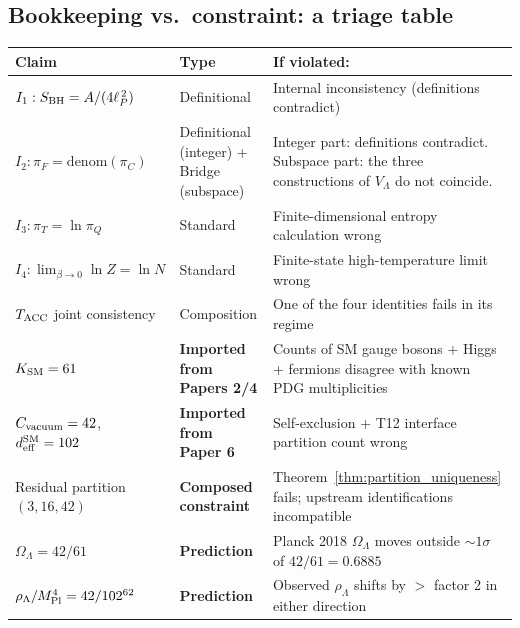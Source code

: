 \documentclass[11pt]{article}
\theoremstyle{plain}
\theoremstyle{definition}
\theoremstyle{remark}
\newcommand{\Mpl}{M_{\rm Pl}}
\begin{document}
\bigskip

\subsection{Bookkeeping vs.\ constraint: a triage table}\label{supp:Iprime1}

\begin{table}[h]
\centering
\small
\setlength{\tabcolsep}{4pt}
\begin{tabularx}{\textwidth}{@{}l l X@{}}
\toprule
\textbf{Claim} & \textbf{Type} & \textbf{If violated:} \\
\midrule
$I_1: S_{\rm BH} = A/(4\ell_P^{\,2})$                & Definitional        & Internal inconsistency (definitions contradict) \\
\addlinespace[2pt]
$I_2: \pi_F = \mathrm{denom}(\pi_C)$                 & Definitional (integer) + Bridge (subspace) & Integer part: definitions contradict.  Subspace part: the three constructions of $V_\Lambda$ do not coincide. \\
\addlinespace[2pt]
$I_3: \pi_T = \ln \pi_Q$                             & Standard            & Finite-dimensional entropy calculation wrong \\
\addlinespace[2pt]
$I_4: \lim_{\beta \to 0} \ln Z = \ln N$              & Standard            & Finite-state high-temperature limit wrong \\
\addlinespace[2pt]
$T_{\rm ACC}$ joint consistency                      & Composition         & One of the four identities fails in its regime \\
\addlinespace[4pt]
$K_{\rm SM} = 61$                                    & \textbf{Imported from Papers 2/4} & Counts of SM gauge bosons + Higgs + fermions disagree with known PDG multiplicities \\
\addlinespace[2pt]
$C_{\rm vacuum} = 42$, $d_{\rm eff}^{\rm SM} = 102$     & \textbf{Imported from Paper 6} & Self-exclusion + T12 interface partition count wrong \\
\addlinespace[2pt]
Residual partition $(3, 16, 42)$                     & \textbf{Composed constraint} & Theorem~\ref{thm:partition_uniqueness} fails; upstream identifications incompatible \\
\addlinespace[4pt]
$\Omega_\Lambda = 42/61$                             & \textbf{Prediction}  & Planck 2018 $\Omega_\Lambda$ moves outside $\sim 1\sigma$ of $42/61 = 0.6885$ \\
\addlinespace[2pt]
$\rho_\Lambda/\Mpl^4 = 42/102^{62}$                   & \textbf{Prediction}  & Observed $\rho_\Lambda$ shifts by $> $ factor 2 in either direction \\

\end{tabularx}
\end{table}
\end{document}
